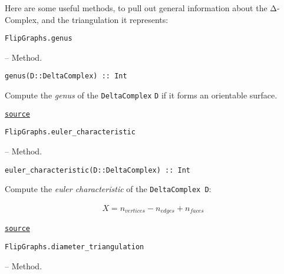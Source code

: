 \label{8213426381003079380}{}


Here are some useful methods, to pull out general information about the Δ-Complex, and the triangulation it represents:


\hypertarget{2459276078495976634}{\texttt{FlipGraphs.genus}}  -- {Method.}

\begin{adjustwidth}{2em}{0pt}


\begin{verbatim}
genus(D::DeltaComplex) :: Int
\end{verbatim}

Compute the \emph{genus} of the \texttt{DeltaComplex} \texttt{D} if it forms an orientable surface.



\href{https://github.com/schto223/FlipGraphs.jl/blob/490c01a7adf74b42f27dda05099165c47ae8133e/src/deltaComplex.jl#L380-L384}{\texttt{source}}


\end{adjustwidth}
\hypertarget{7011472771353721906}{\texttt{FlipGraphs.euler\_characteristic}}  -- {Method.}

\begin{adjustwidth}{2em}{0pt}


\begin{verbatim}
euler_characteristic(D::DeltaComplex) :: Int
\end{verbatim}

Compute the \emph{euler characteristic} of the \texttt{DeltaComplex D}:

\begin{equation*}
\begin{split}X = n_{vertices} - n_{edges} + n_{faces} \end{split}\end{equation*}


\href{https://github.com/schto223/FlipGraphs.jl/blob/490c01a7adf74b42f27dda05099165c47ae8133e/src/deltaComplex.jl#L368-L376}{\texttt{source}}


\end{adjustwidth}
\hypertarget{16918497129552259148}{\texttt{FlipGraphs.diameter\_triangulation}}  -- {Method.}


